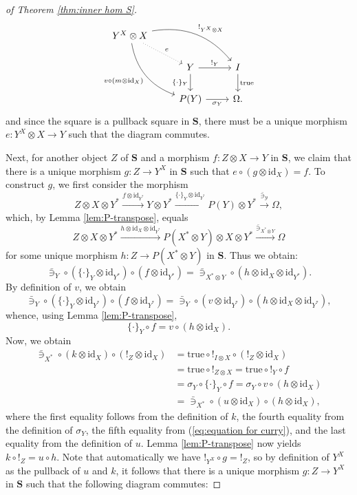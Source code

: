 \documentclass[12pt]{tac}
\theoremstyle{definition}
\theoremstyle{remark}
\newcommand{\Y}{\mathcal Y}
\newcommand{\<}{\langle}
\renewcommand{\>}{\rangle}
\renewcommand{\:}{\colon}
\newcommand{\id}{\mathrm{id}}
\newcommand{\true}{\mathrm{true}}
\begin{document}
\begin{proof}[of Theorem \ref{thm:inner hom S}]
 \[\begin{tikzcd}
Y^X\otimes X\arrow[bend right=30,swap]{ddr}{v\circ(m\otimes\id_X)}\arrow[bend left=30]{rrd}{!_{Y^X\otimes X}}\arrow[dotted]{dr}{e} &&\\
&Y\ar{d}[swap]{\{\cdot\}_Y}\ar{r}{!_Y} & I\ar{d}{\true}\\
&P(Y)\ar{r}[swap]{\sigma_Y} &\Omega.
\end{tikzcd}\]
and since the square is a pullback square in $\mathbf S$, there must be a unique morphism $e:Y^ X\otimes X\to Y$ such that the diagram commutes. 

Next, for another object $Z$ of $\mathbf S$ and a morphism $f:Z\otimes X\to Y$ in $\mathbf S$, we claim that there is a unique morphism $g:Z\to Y^X$ in $\mathbf S$ such that $e\circ (g\otimes\id_X)=f$. To construct $g$, we first consider the morphism
\[Z\otimes X\otimes Y^*\xrightarrow{f\otimes \id_{Y^*}}Y\otimes Y^*\xrightarrow{\{\cdot\}_Y\otimes\id_{Y^*}}P(Y)\otimes Y^*\xrightarrow{\bar\ni_\Y}\Omega,\]
which, by Lemma \ref{lem:P-transpose}, equals
\[Z\otimes X\otimes Y^*\xrightarrow{h\otimes\id_X\otimes\id_{Y^*}}P(X^*\otimes Y)\otimes X\otimes Y^*\xrightarrow{\bar\ni_{X^*\otimes Y}}\Omega\]
for some unique morphism $h:Z\to P(X^*\otimes Y)$ in $\mathbf S$. Thus we obtain:
\[\bar\ni_Y\circ (\{\cdot\}_Y\otimes\id_{Y^*})\circ (f\otimes\id_{Y^*})=\bar\ni_{X^*\otimes Y}\circ (h\otimes\id_X\otimes\id_{Y^*}).\]
By definition of $v$, we obtain
\[\bar\ni_Y\circ (\{\cdot\}_Y\otimes\id_{Y^*})\circ (f\otimes\id_{Y^*})=\bar\ni_{Y}\circ(v\otimes\id_{Y^*})\circ(h\otimes\id_X\otimes\id_{Y^*}),\]
whence, using Lemma \ref{lem:P-transpose},
\begin{equation}\label{eq:equation for curry}
    \{\cdot\}_Y\circ f=v\circ (h\otimes\id_{X}).
\end{equation}
Now, we obtain
\begin{align*}
    \bar\ni_{X^*}\circ (k\otimes\id_{X})\circ (!_Z\otimes\id_X) & = \true\circ !_{I\otimes X}\circ  (!_Z\otimes\id_X)\\
    & = \true\circ !_{Z\otimes X}=\true\circ !_Y\circ f\\
    & = \sigma_Y\circ \{\cdot\}_Y\circ f=\sigma_Y\circ v\circ (h\otimes\id_{X})\\
    & = \bar\ni_{X^*}\circ (u\otimes\id_X)\circ (h\otimes\id_X),
    \end{align*}
    where the first equality follows from the definition of $k$, the fourth equality from the definition of $\sigma_Y$, the fifth equality from (\ref{eq:equation for curry}), and the last equality from the definition of $u$. Lemma \ref{lem:P-transpose} now yields $k\circ !_Z=u\circ h$. Note that automatically we have $!_{Y^ X}\circ g=!_Z$, so by definition of $Y^X$ as the pullback of $u$ and $k$, it follows that there is a unique morphism $g:Z\to Y^X$ in $\mathbf S$ such that the following diagram commutes:

\end{proof}
\end{document}
